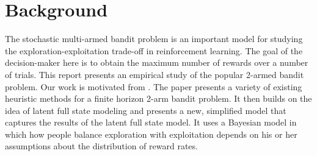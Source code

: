 \section{Background}
\label{background}

The stochastic multi-armed bandit problem is an important model for studying the exploration-exploitation trade-off in reinforcement learning. The goal of the decision-maker here is to obtain the maximum number of rewards over a number of trials. This report presents an empirical study of the popular 2-armed bandit problem. Our work is motivated from \cite{shunan2009}. The paper presents a variety of existing heuristic methods for a finite horizon 2-arm bandit problem. It then builds on the idea of latent full state modeling and presents a new, simplified model that captures the results of the latent full state model. It uses a Bayesian model in which how people balance exploration with exploitation depends on his or her assumptions about the distribution of reward rates. 



 